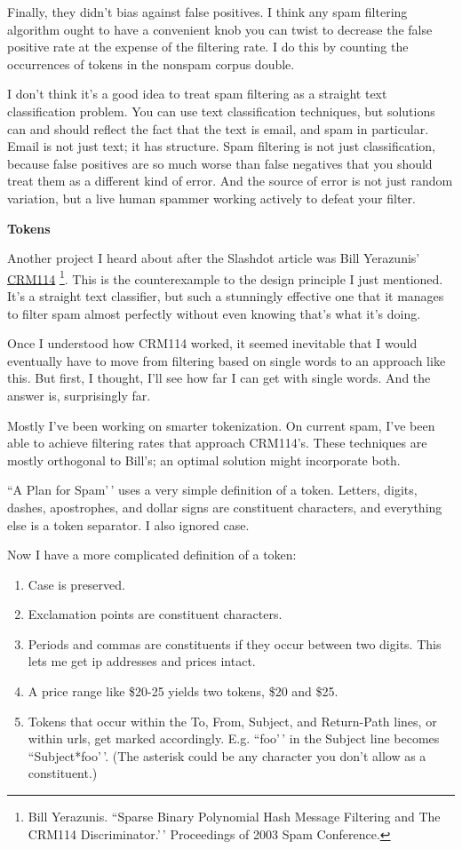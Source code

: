 \documentclass[12pt]{book}
\begin{document}
Finally, they didn't bias against false positives. I think any spam
filtering algorithm ought to have a convenient knob you can twist to
decrease the false positive rate at the expense of the filtering rate. I
do this by counting the occurrences of tokens in the nonspam corpus
double.

I don't think it's a good idea to treat spam filtering as a straight
text classification problem. You can use text classification techniques,
but solutions can and should reflect the fact that the text is email,
and spam in particular. Email is not just text; it has structure. Spam
filtering is not just classification, because false positives are so
much worse than false negatives that you should treat them as a
different kind of error. And the source of error is not just random
variation, but a live human spammer working actively to defeat your
filter.

\textbf{Tokens}

Another project I heard about after the Slashdot article was Bill
Yerazunis' \href{http://crm114.sourceforge.net}{CRM114} \footnote{Bill Yerazunis. ``Sparse Binary Polynomial Hash Message
Filtering and The CRM114 Discriminator.'\,' Proceedings of 2003 Spam
Conference.}. This is
the counterexample to the design principle I just mentioned. It's a
straight text classifier, but such a stunningly effective one that it
manages to filter spam almost perfectly without even knowing that's what
it's doing.

Once I understood how CRM114 worked, it seemed inevitable that I would
eventually have to move from filtering based on single words to an
approach like this. But first, I thought, I'll see how far I can get
with single words. And the answer is, surprisingly far.

Mostly I've been working on smarter tokenization. On current spam, I've
been able to achieve filtering rates that approach CRM114's. These
techniques are mostly orthogonal to Bill's; an optimal solution might
incorporate both.

``A Plan for Spam'\,' uses a very simple definition of a token. Letters,
digits, dashes, apostrophes, and dollar signs are constituent
characters, and everything else is a token separator. I also ignored
case.

Now I have a more complicated definition of a token:

\begin{enumerate}
\def\labelenumi{\arabic{enumi}.}
\item
  Case is preserved.
\item
  Exclamation points are constituent characters.
\item
  Periods and commas are constituents if they occur between two digits.
  This lets me get ip addresses and prices intact.
\item
  A price range like \$20-25 yields two tokens, \$20 and \$25.
\item
  Tokens that occur within the To, From, Subject, and Return-Path lines,
  or within urls, get marked accordingly. E.g. ``foo'\,' in the Subject
  line becomes ``Subject*foo'\,'. (The asterisk could be any character
  you don't allow as a constituent.)
\end{enumerate}
\end{document}
